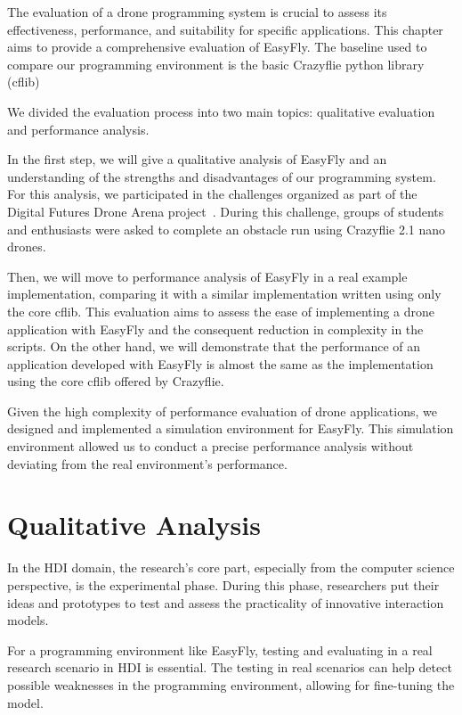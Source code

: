 The evaluation of a drone programming system is crucial to assess its effectiveness, performance, and suitability for specific applications. 
This chapter aims to provide a comprehensive evaluation of EasyFly. 
The baseline used to compare our programming environment is the basic Crazyflie python library (cflib) 

We divided the evaluation process into two main topics: qualitative evaluation and performance analysis.

In the first step, we will give a qualitative analysis of EasyFly and an understanding of the strengths and disadvantages of our programming system.
For this analysis, we participated in the challenges organized as part of the Digital Futures Drone Arena project~\cite{dronearena}.
During this challenge, groups of students and enthusiasts were asked to complete an obstacle run using Crazyflie 2.1 nano drones.

Then, we will move to performance analysis of EasyFly in a real example implementation, comparing it with a similar implementation written using only the core cflib.
This evaluation aims to assess the ease of implementing a drone application with EasyFly and the consequent reduction in complexity in the scripts. 
On the other hand, we will demonstrate that the performance of an application developed with EasyFly is almost the same as the implementation using the core cflib offered by Crazyflie.

Given the high complexity of performance evaluation of drone applications, we designed and implemented a simulation environment for EasyFly.
This simulation environment allowed us to conduct a precise performance analysis without deviating from the real environment's performance.

\section{Qualitative Analysis}\label{sec:qualitative_analysis}
In the HDI domain, the research's core part, especially from the computer science perspective,
is the experimental phase. During this phase, researchers put their ideas and prototypes to test
and assess the practicality of innovative interaction models.

For a programming environment like EasyFly, testing and evaluating in a real research scenario in HDI is essential. 
The testing in real scenarios can help detect possible weaknesses in the programming environment, allowing for fine-tuning the model.

